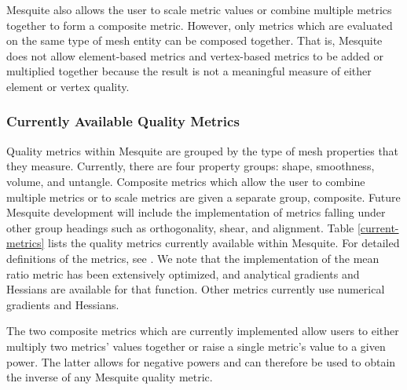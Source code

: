 \documentclass[letter]{report}
\begin{document}
Mesquite also allows the user to scale metric values or combine
multiple metrics together to form a composite metric.  However, only
metrics which are evaluated on the same type of mesh entity can be
composed together.  That is, Mesquite does not allow element-based
metrics and vertex-based metrics to be added or multiplied together
because the result is not a meaningful measure of either element or
vertex quality.

\subsubsection{Currently Available Quality Metrics}  
Quality metrics within
Mesquite are grouped by the type of mesh properties that they measure.
Currently, there are four property groups: shape, smoothness, volume,
and untangle.  Composite metrics which allow the user to combine
multiple metrics or to scale metrics are given a separate group,
composite.  Future Mesquite development will include the
implementation of metrics falling under other group headings such as
orthogonality, shear, and alignment.  Table \ref{current-metrics}
lists the quality metrics currently available within Mesquite.  For
detailed definitions of the metrics, see \cite{Kn01}.  We note that
the implementation of the mean ratio metric has been extensively
optimized, and analytical gradients and Hessians are available for
that function.  Other metrics currently use numerical gradients and
Hessians.

The two composite metrics which are currently implemented
allow users to either multiply two metrics' values
together or raise a single metric's value to a given power.
The latter allows for negative powers and can therefore be used
to obtain the inverse of any Mesquite quality metric.  
\end{document}
